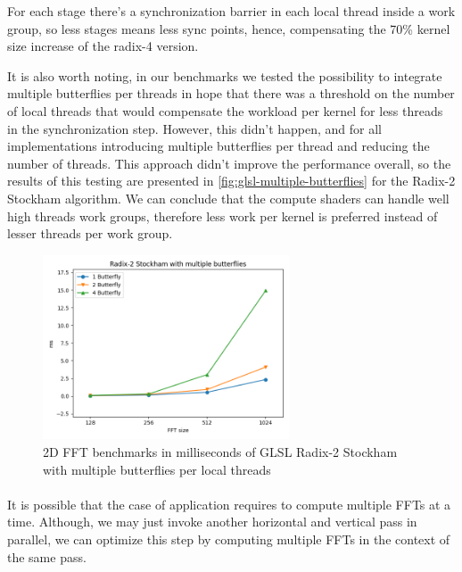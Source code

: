 \documentclass[
  oneside,
  11pt, a4paper,
  footinclude=true,
  headinclude=true,
  cleardoublepage=empty
]{scrbook}
\begin{document}
For each stage there's a synchronization barrier in each local thread inside a work group, so less stages means less sync points, hence, compensating the 70\% kernel size increase of the radix-4 version.

It is also worth noting, in our benchmarks we tested the possibility to integrate multiple butterflies per threads in hope that there was a threshold on the number of local threads that would compensate the workload per kernel for less threads in the synchronization step. However, this didn't happen, and for all implementations introducing multiple butterflies per thread and reducing the number of threads. This approach didn't improve the performance overall, so the results of this testing are presented in \autoref{fig:glsl-multiple-butterflies} for the Radix-2 Stockham algorithm. We can conclude that the compute shaders can handle well high threads work groups, therefore less work per kernel is preferred instead of lesser threads per work group.

\begin{figure}[H] 
    \centering
    \includegraphics[width=0.65\textwidth]{img/results/glsl_multiple_butterflies.png}
    \caption{2D FFT benchmarks in milliseconds of GLSL Radix-2 Stockham with multiple butterflies per local threads}
    \label{fig:glsl-multiple-butterflies}
\end{figure}

\paragraph{}
It is possible that the case of application requires to compute multiple FFTs at a time. Although, we may just invoke another horizontal and vertical pass in parallel, we can optimize this step by computing multiple FFTs in the context of the same pass. 
\end{document}
